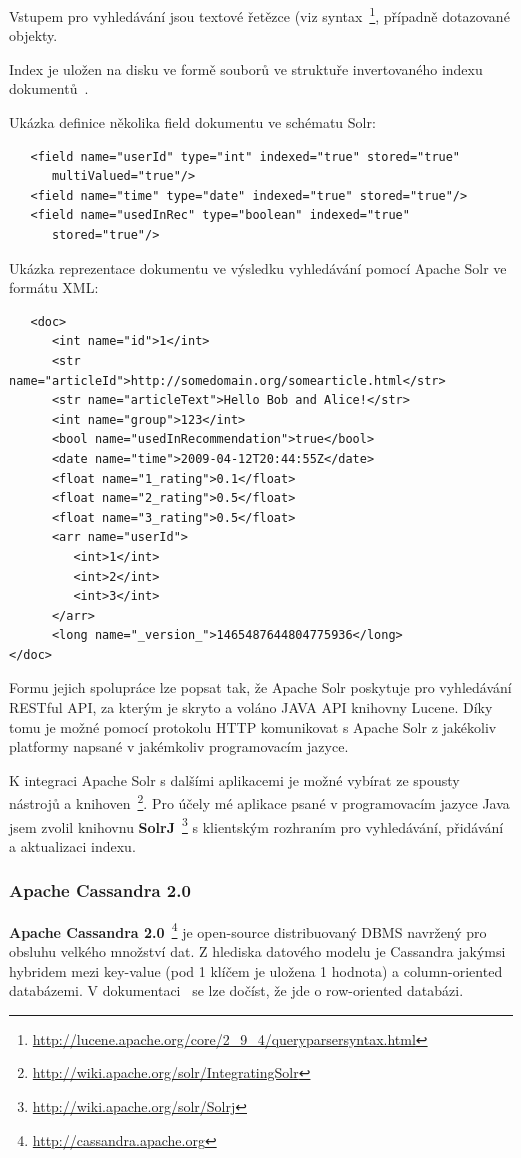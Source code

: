 \documentclass[thesis=M,czech]{FITthesis}[2014/05/07]
\begin{document}
Vstupem pro vyhledávání jsou textové řetězce (viz syntax~\footnote{\url{http://lucene.apache.org/core/2_9_4/queryparsersyntax.html}}, případně dotazované objekty.

Index je uložen na disku ve formě souborů ve struktuře invertovaného indexu dokumentů~\cite{wiki:invindex}.

Ukázka definice několika field dokumentu ve schématu Solr:

\begin{verbatim}
   <field name="userId" type="int" indexed="true" stored="true"
      multiValued="true"/>	
   <field name="time" type="date" indexed="true" stored="true"/>
   <field name="usedInRec" type="boolean" indexed="true"
      stored="true"/>
\end{verbatim}

Ukázka reprezentace dokumentu ve výsledku vyhledávání pomocí Apache Solr ve formátu XML:

\begin{verbatim}
   <doc>
      <int name="id">1</int>
      <str name="articleId">http://somedomain.org/somearticle.html</str>
      <str name="articleText">Hello Bob and Alice!</str>
      <int name="group">123</int>
      <bool name="usedInRecommendation">true</bool>
      <date name="time">2009-04-12T20:44:55Z</date>
      <float name="1_rating">0.1</float>
      <float name="2_rating">0.5</float>
      <float name="3_rating">0.5</float>      
      <arr name="userId">
         <int>1</int>
         <int>2</int>
         <int>3</int>
      </arr>
      <long name="_version_">1465487644804775936</long>      
</doc>
\end{verbatim}

Formu jejich spolupráce lze popsat tak, že Apache Solr poskytuje pro vyhledávání RESTful API, za kterým je skryto a voláno JAVA API knihovny Lucene. Díky tomu je možné pomocí protokolu HTTP komunikovat s Apache Solr z jakékoliv platformy napsané v jakémkoliv programovacím jazyce. 

K integraci Apache Solr s dalšími aplikacemi je možné vybírat ze spousty nástrojů a knihoven~\footnote{\url{http://wiki.apache.org/solr/IntegratingSolr}}. Pro účely mé aplikace psané v programovacím jazyce Java jsem zvolil knihovnu \textbf{SolrJ}~\footnote{\url{http://wiki.apache.org/solr/Solrj}} s klientským rozhraním pro vyhledávání, přidávání a aktualizaci indexu. 

\subsubsection{Apache Cassandra 2.0}
\textbf{Apache Cassandra 2.0}~\footnote{\url{http://cassandra.apache.org}} je open-source distribuovaný DBMS navržený pro obsluhu velkého množství dat. Z hlediska datového modelu je Cassandra jakýmsi hybridem mezi key-value (pod 1 klíčem je uložena 1 hodnota) a column-oriented databázemi. V dokumentaci~\cite{cassdoc} se lze dočíst, že jde o row-oriented databázi.
\end{document}
